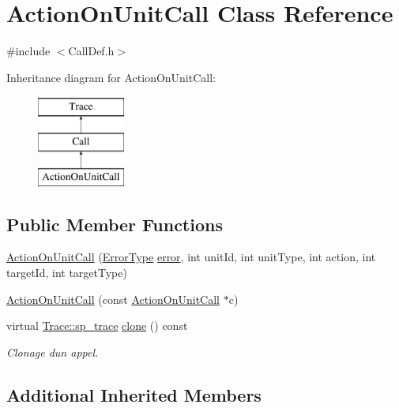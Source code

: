 \hypertarget{class_action_on_unit_call}{}\section{Action\+On\+Unit\+Call Class Reference}
\label{class_action_on_unit_call}


{\ttfamily \#include $<$Call\+Def.\+h$>$}

Inheritance diagram for Action\+On\+Unit\+Call\+:\begin{figure}[H]
\begin{center}
\leavevmode
\includegraphics[height=3.000000cm]{class_action_on_unit_call}
\end{center}
\end{figure}
\subsection*{Public Member Functions}
\begin{DoxyCompactItemize}
\item 
\hyperlink{class_action_on_unit_call_acb61630fce1f24fee92c07fa291562f3}{Action\+On\+Unit\+Call} (\hyperlink{class_call_ade833a08ce215aaa4121102f3448c898}{Error\+Type} \hyperlink{class_call_a206f6150a8038fda48c17c2c7421aed1}{error}, int unit\+Id, int unit\+Type, int action, int target\+Id, int target\+Type)
\item 
\hyperlink{class_action_on_unit_call_a89332928b84f6a14a4cc558de2f73f86}{Action\+On\+Unit\+Call} (const \hyperlink{class_action_on_unit_call}{Action\+On\+Unit\+Call} $\ast$c)
\item 
virtual \hyperlink{class_trace_a9c58e523529fc8a03fb6acf3eef86150}{Trace\+::sp\+\_\+trace} \hyperlink{class_action_on_unit_call_ab127ed211f2b34f476cd0f4ef20d6057}{clone} () const 
\begin{DoxyCompactList}\small\item\em Clonage d\textquotesingle{}un appel. \end{DoxyCompactList}\end{DoxyCompactItemize}
\subsection*{Additional Inherited Members}


